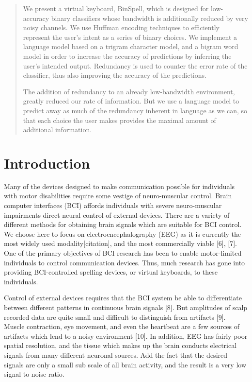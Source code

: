 \documentclass[12pt,titlepage]{article}
\begin{document}
\begin{abstract}
We present a virtual keyboard, BinSpell, which is designed for low-accuracy binary classifiers 
whose bandwidth is additionally reduced by very noisy channels.  We use Huffman encoding 
techniques to efficiently represent the user's intent as a series of binary choices.  We implement 
a language model based on a trigram character model, and a bigram word model in order to 
increase the accuracy of predictions by inferring the user's intended output. Redundancy is used 
to counter the error rate of the classifier, thus also improving the accuracy of the predictions.

The addition of redundancy to an already low-bandwidth environment, greatly reduced our rate 
of information. But we use a language model to predict away as much of the redundancy 
inherent in language as we can, so that each choice the user makes provides the maximal 
amount of additional information.
\end{abstract}


\section{Introduction}

Many of the devices designed to make communication possible for individuals with motor 
disabilities require some vestige of neuro-muscular control.  Brain computer interfaces (BCI) 
affords individuals with severe neuro-muscular impairments direct neural control of external 
devices.  There are a variety of different methods for obtaining brain signals which are suitable 
for BCI control.  We choose here to focus on electroencephalography (EEG) as it is   currently 
the most widely used modality[citation], and the most commercially viable [6], [7].  One of the 
primary objectives of BCI research has been to enable motor-limited individuals to control 
communication devices.  Thus, much research has gone into providing BCI-controlled spelling 
devices, or virtual keyboards, to these individuals.

Control of external devices requires that the BCI system be able to differentiate between 
different patterns in continuous brain signals [8].  But amplitudes of scalp recorded data are quite 
small and difficult to distinguish from artifacts [9].  Muscle contraction, eye movement, and even 
the heartbeat are a few sources of artifacts which lend to a noisy environment [10].  In addition, 
EEG has fairly poor spatial resolution, and the tissue which makes up the brain conducts 
electrical signals from many different neuronal sources.  Add the fact that the desired signals 
are only a small sub scale of all brain activity, and the result is a very low signal to noise ratio.
\end{document}
